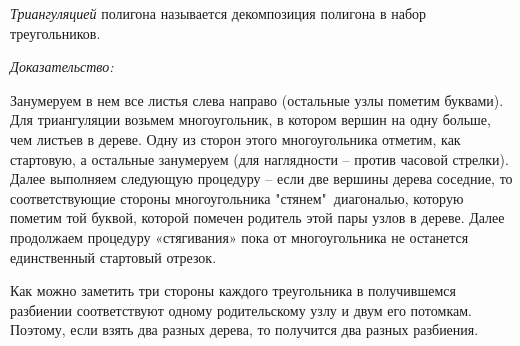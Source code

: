 \begin{itemize}
	\textit{Триангуляцией} полигона называется декомпозиция полигона в набор треугольников.
	
	\begin{figure}[H]
	\end{figure}

	\noindent\textit{Доказательство:}
	
	Занумеруем в нем все листья слева направо (остальные узлы пометим буквами). Для триангуляции возьмем многоугольник, в котором вершин на одну больше, чем листьев в дереве. Одну из сторон этого многоугольника отметим, как стартовую, а остальные занумеруем (для наглядности – против часовой стрелки).
	Далее выполняем следующую процедуру – если две вершины дерева соседние, то соответствующие стороны многоугольника "стянем"\, диагональю, которую пометим той буквой, которой помечен родитель этой пары узлов в дереве. Далее продолжаем процедуру «стягивания» пока от многоугольника не останется единственный стартовый отрезок.
	\begin{figure}[H]
	\end{figure}
	Как можно заметить три стороны каждого треугольника в получившемся разбиении соответствуют одному родительскому узлу и двум его потомкам. Поэтому, если взять два разных дерева, то получится два разных разбиения.
\end{itemize}

